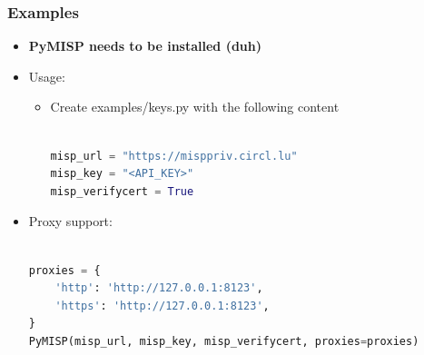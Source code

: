 \begin{frame}[fragile]
    \frametitle{Examples}
    \begin{itemize}
        \item {\bf PyMISP needs to be installed (duh)}
        \item Usage:
        \begin{itemize}
            \item Create examples/keys.py with the following content
        	\begin{adjustbox}{width=\textwidth,height=.9cm,keepaspectratio}
            	\begin{lstlisting}[language=python,firstnumber=1]

misp_url = "https://misppriv.circl.lu"
misp_key = "<API_KEY>"
misp_verifycert = True

            	\end{lstlisting}
        	\end{adjustbox}
		\end{itemize}
		\item Proxy support:
		\begin{adjustbox}{width=\textwidth,height=.9cm,keepaspectratio}
			\begin{lstlisting}[language=python,firstnumber=1]

proxies = {
	'http': 'http://127.0.0.1:8123',
	'https': 'http://127.0.0.1:8123',
}
PyMISP(misp_url, misp_key, misp_verifycert, proxies=proxies)
			\end{lstlisting}
		\end{adjustbox}
    \end{itemize}
\end{frame}

